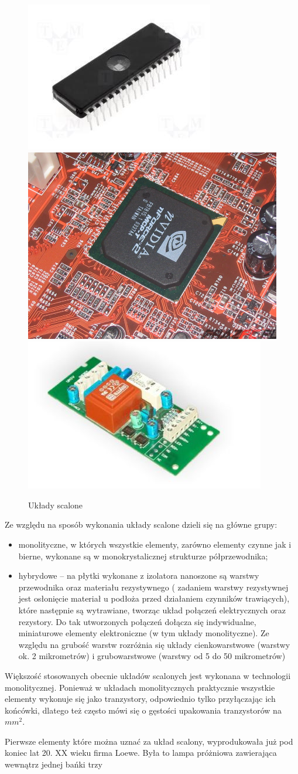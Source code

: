 \documentclass[a4paper,11pt]{article}
\begin{document}
\begin{figure}[htp]
\centering
\includegraphics[width=.3\textwidth]{uklad1}\hfill
\includegraphics[width=.3\textwidth]{uklad2}\hfill
\includegraphics[width=.3\textwidth]{uklad3}

\caption{Układy scalone}
\label{fig:figure3}

\end{figure}
 
Ze względu na sposób wykonania układy scalone dzieli się na główne grupy:  
 \begin{itemize}
 \item  monolityczne, w których wszystkie elementy, zarówno elementy czynne jak i bierne, wykonane są w monokrystalicznej strukturze półprzewodnika; 
 \item  hybrydowe -- na płytki wykonane z izolatora nanoszone są warstwy przewodnika oraz materiału rezystywnego ( zadaniem warstwy rezystywnej jest osłonięcie materiał u podłoża przed działaniem czynników trawiących), które następnie są wytrawiane, tworząc układ połączeń elektrycznych oraz rezystory. Do tak utworzonych połączeń dołącza się indywidualne, miniaturowe elementy elektroniczne (w tym układy monolityczne). Ze względu na grubość warstw rozróżnia się układy cienkowarstwowe (warstwy ok. 2 mikrometrów) i grubowarstwowe (warstwy od 5 do 50 mikrometrów) 
 \end{itemize}
 
Większość stosowanych obecnie układów scalonych jest wykonana w technologii monolitycznej. Ponieważ w układach monolitycznych praktycznie wszystkie elementy wykonuje się jako tranzystory, odpowiednio tylko przyłączając ich końcówki, dlatego też często mówi się o gęstości upakowania tranzystorów na $ mm^2 $.  \par
Pierwsze elementy które można uznać za układ scalony, wyprodukowała już pod koniec lat 20. XX wieku firma Loewe. Była to lampa próżniowa zawierająca wewnątrz jednej bańki trzy \parfillskip=0pt 
\end{document}
